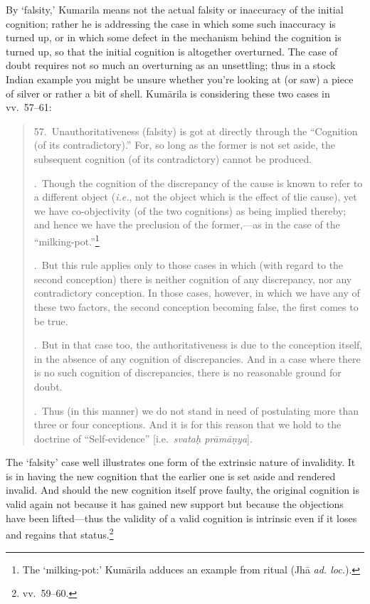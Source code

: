 \documentclass[11pt,letterpaper,oneside]{amsart}
\newenvironment{squote}{\begin{quote}\sf\small}{\rm\end{quote}} %
\begin{document}
By `falsity,' Kumarila means not the actual falsity or inaccuracy of the initial cognition; rather he is addressing the case in which some such inaccuracy is turned up, or in which some defect in the mechanism behind the cognition is turned up, so that the initial cognition is altogether overturned. The case of doubt requires not so much an overturning as an unsettling; thus in a stock Indian example you might be unsure whether you're looking at (or saw) a piece of silver or rather a bit of shell. Kum\=arila is considering these two cases in vv.\ 57--61:\begin{squote}57.\ Unauthoritativeness (falsity) is got at directly through the ``Cognition (of its contradictory).'' For, so long as the former is not set aside, the subsequent cognition (of its contradictory) cannot be produced.

.\ Though the cognition of the discrepancy of the cause is known to refer to a different object (\emph{i.e.}, not the object which is the effect of tlie cause), yet we have co-objectivity (of the two cognitions) as being implied thereby; and hence we have the preclusion of the former,---as in the case of the ``milking-pot.''\footnote{The `milking-pot:' Kum\=arila adduces an example from ritual (Jh\=a \emph{ad. loc.}).}

.\ But this rule applies only to those cases in which (with regard to the second conception) there is neither cognition of any discrepancy, nor any contradictory conception. In those cases, however, in which we have any of these two factors, the second conception becoming false, the first comes to be true. 

.\ But in that case too, the authoritativeness is due to the conception itself, in the absence of any cognition of discrepancies. And in a case where there is no such cognition of discrepancies, there is no reasonable ground for doubt. 

.\ Thus (in this manner) we do not stand in need of postulating more than three or four conceptions. And it is for this reason that we hold to the doctrine of ``Self-evidence'' [i.e.~\emph{svata\d h pr\=am\=a\d nya}].\end{squote} The `falsity' case well illustrates one form of the extrinsic nature of invalidity. It is in having the new cognition that the earlier one is set aside and rendered invalid. And should the new cognition itself prove faulty, the original cognition is valid again not because it has gained new support but because the objections have been lifted---thus the validity of a valid cognition is intrinsic even if it loses and regains that status.\footnote{vv.\ 59--60.}
\end{document}
